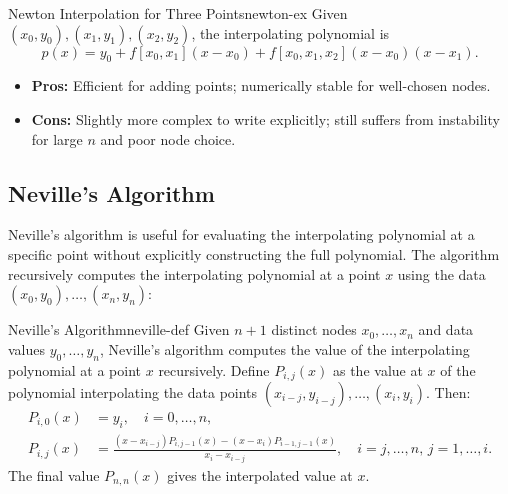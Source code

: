 \begin{example}{Newton Interpolation for Three Points}{newton-ex}
    Given \((x_0, y_0), (x_1, y_1), (x_2, y_2)\), the interpolating polynomial is
    \[
        p(x) = y_0 + f[x_0, x_1](x-x_0) + f[x_0, x_1, x_2](x-x_0)(x-x_1).
    \]
\end{example}

\begin{itemize}[nosep]
    \item \textbf{Pros:} Efficient for adding points; numerically stable for well-chosen nodes.
    \item \textbf{Cons:} Slightly more complex to write explicitly; still suffers from instability for large \(n\) and poor node choice.
\end{itemize}

\subsection{Neville's Algorithm}
Neville's algorithm is useful for evaluating the interpolating polynomial at a specific point without explicitly constructing the full polynomial.
The algorithm recursively computes the interpolating polynomial at a point \(x\) using the data \((x_0, y_0), \ldots, (x_n, y_n)\):

\begin{definition}{Neville's Algorithm}{neville-def}
    Given \(n+1\) distinct nodes \(x_0, \ldots, x_n\) and data values \(y_0, \ldots, y_n\), Neville's algorithm computes the value of the interpolating polynomial at a point \(x\) recursively. Define \(P_{i,j}(x)\) as the value at \(x\) of the polynomial interpolating the data points \((x_{i-j}, y_{i-j}), \ldots, (x_i, y_i)\). Then:
    \begin{align}
        P_{i,0}(x) &= y_i, \quad i = 0, \ldots, n, \\
        P_{i,j}(x) &= \frac{(x - x_{i-j}) P_{i,j-1}(x) - (x - x_i) P_{i-1,j-1}(x)}{x_i - x_{i-j}}, \quad i = j, \ldots, n, \, j = 1, \ldots, i.
    \end{align}
    The final value \(P_{n,n}(x)\) gives the interpolated value at \(x\).
\end{definition}

